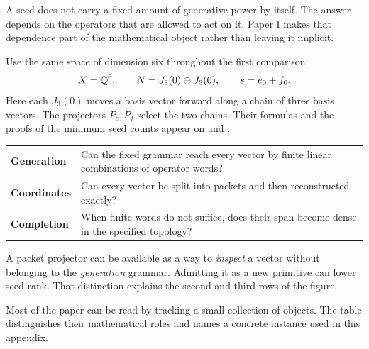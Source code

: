 
A seed does not carry a fixed amount of generative power by itself. The answer depends on the operators that are allowed to act on it. Paper I makes that dependence part of the mathematical object rather than leaving it implicit.

Use the same space of dimension six throughout the first comparison:
\[
X=\mathbb Q^6,\qquad N=J_3(0)\oplus J_3(0),\qquad
s=e_0+f_0.
\]
Here each $J_3(0)$ moves a basis vector forward along a chain of three basis vectors. The projectors $P_e,P_f$ select the two chains. Their formulas and the proofs of the minimum seed counts appear on  and .


\begin{tabularx}{\linewidth}{@{}p{.18\linewidth}Y@{}}
\textbf{Generation} & Can the fixed grammar reach every vector by finite linear combinations of operator words?\\[4pt]
\textbf{Coordinates} & Can every vector be split into packets and then reconstructed exactly?\\[4pt]
\textbf{Completion} & When finite words do not suffice, does their span become dense in the specified topology?
\end{tabularx}

A packet projector can be available as a way to \emph{inspect} a vector without belonging to the \emph{generation} grammar. Admitting it as a new primitive can lower seed rank. That distinction explains the second and third rows of the figure.


Most of the paper can be read by tracking a small collection of objects. The table distinguishes their mathematical roles and names a concrete instance used in this appendix.

